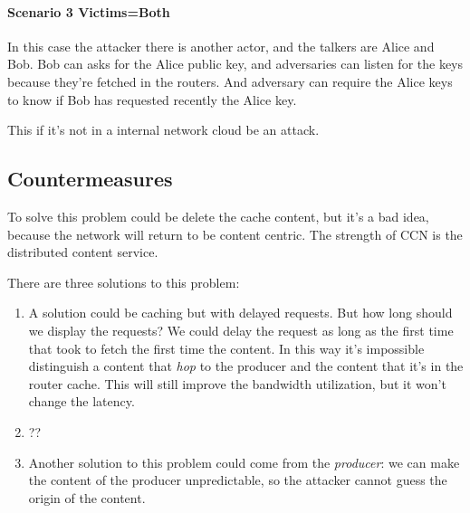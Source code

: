 \paragraph{Scenario 3 Victims=Both}
In this case the attacker there is another actor, and the talkers are Alice and
Bob. Bob can asks for the Alice public key, and adversaries can listen for the
keys because they're fetched in the routers. And adversary can require the
Alice keys to know if Bob has requested recently the Alice key.

This if it's not in a internal network cloud be an attack.

\subsection{Countermeasures}

To solve this problem could be delete the cache content, but it's a bad idea,
because the network will return to be content centric. The strength of CCN is
the distributed content service.

There are three solutions to this problem:
\begin{enumerate}
  \item A solution could be caching but with delayed requests. But how long
should we display the requests? We could delay the request as long as the
first time that   took to fetch the first time the content. In this way it's
impossible distinguish a content that \textit{hop} to the producer and the
content that it's in the router cache. This will still improve the bandwidth
utilization, but it won't change the latency.

  \item ??

  \item Another solution to this problem could come from the \textit{producer}:
we can make the content of the producer unpredictable, so the attacker cannot
guess the origin of the content.

\end{enumerate}

